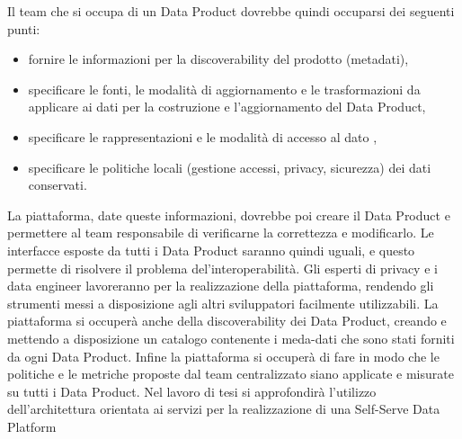 \documentclass[12pt]{report}
\begin{document}
Il team che si occupa di un Data Product dovrebbe quindi occuparsi dei seguenti punti:
\begin{itemize}
    \item fornire le informazioni per la discoverability del prodotto (metadati),
    \item specificare le fonti, le modalità di aggiornamento e le trasformazioni da applicare ai dati per la costruzione e l'aggiornamento del Data Product,
    \item specificare le rappresentazioni e le modalità di accesso al dato ,
    \item specificare le politiche locali (gestione accessi, privacy, sicurezza) dei dati conservati.
\end{itemize}
La piattaforma, date queste informazioni, dovrebbe poi creare il Data Product e permettere al team responsabile di verificarne la correttezza e modificarlo. 
Le interfacce esposte da tutti i Data Product saranno quindi uguali, e questo permette di risolvere il problema del'interoperabilità.
Gli esperti di privacy e i data engineer lavoreranno per la realizzazione della piattaforma, rendendo gli strumenti messi a disposizione agli altri sviluppatori facilmente utilizzabili.
La piattaforma si occuperà anche della discoverability dei Data Product, creando e mettendo a disposizione un catalogo contenente i meda-dati che sono stati forniti da ogni Data Product.
Infine la piattaforma si occuperà di fare in modo che le politiche e le metriche proposte dal team centralizzato siano applicate e misurate su tutti i Data Product.
Nel lavoro di tesi si approfondirà l'utilizzo dell'architettura orientata ai servizi per la realizzazione di una Self-Serve Data Platform
\end{document}
